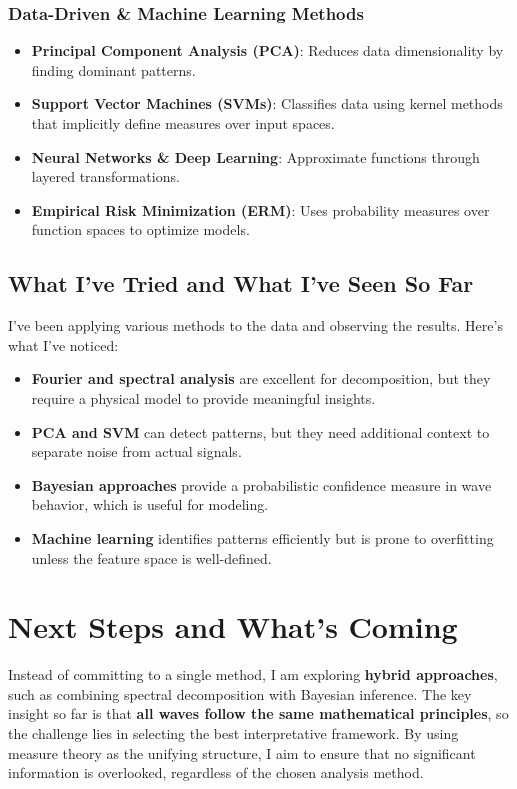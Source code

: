 \documentclass{article}
\begin{document}
\subsubsection{Data-Driven \& Machine Learning Methods}

\begin{itemize}
    \item \textbf{Principal Component Analysis (PCA)}: Reduces data dimensionality by finding dominant patterns.
    \item \textbf{Support Vector Machines (SVMs)}: Classifies data using kernel methods that implicitly define measures over input spaces.
    \item \textbf{Neural Networks \& Deep Learning}: Approximate functions through layered transformations.
    \item \textbf{Empirical Risk Minimization (ERM)}: Uses probability measures over function spaces to optimize models.
\end{itemize}

\subsection{What I’ve Tried and What I’ve Seen So Far}

I’ve been applying various methods to the data and observing the results. Here’s what I’ve noticed:

\begin{itemize}
    \item \textbf{Fourier and spectral analysis} are excellent for decomposition, but they require a physical model to provide meaningful insights.
    \item \textbf{PCA and SVM} can detect patterns, but they need additional context to separate noise from actual signals.
    \item \textbf{Bayesian approaches} provide a probabilistic confidence measure in wave behavior, which is useful for modeling.
    \item \textbf{Machine learning} identifies patterns efficiently but is prone to overfitting unless the feature space is well-defined.
\end{itemize}

\section{Next Steps and What’s Coming}

Instead of committing to a single method, I am exploring \textbf{hybrid approaches}, such as combining spectral decomposition with Bayesian inference. The key insight so far is that \textbf{all waves follow the same mathematical principles}, so the challenge lies in selecting the best interpretative framework. By using measure theory as the unifying structure, I aim to ensure that no significant information is overlooked, regardless of the chosen analysis method.
\end{document}
